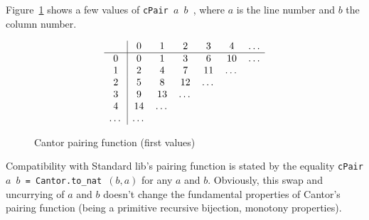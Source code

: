       Figure~\ref{fig:cpair} shows a few values of
      \texttt{cPair\,$a$\,$b$ }, where $a$ is the line number and $b$ the column number.

      \begin{figure}[h]
        \centering

         \[
        \begin{array}[h]{c|cccccc}
          &0&1&2&3&4&\dots \\
          \hline 
          0&0&1&3& 6 & 10&\dots \\
          1&2&4&7&11& \dots& \\
          2&5&8 & 12& \dots&& \\
            3&9&13&\dots & && \\
          4&14&\dots&&&&\\
          \dots&\dots&&&&&\\
        \end{array}
        \]
        
        \caption{Cantor pairing function (first values)\label{fig:cpair}}
      \end{figure}


      \begin{remark}
        Compatibility with Standard lib's pairing function
        is stated
        by the equality \texttt{cPair $a$ $b$ = Cantor.to\_nat $(b,a)$} for any $a$ and $b$. Obviously, this swap and uncurrying of $a$ and $b$ doesn't change the fundamental properties of Cantor's pairing function (being a primitive recursive bijection, monotony properties).
      \end{remark}